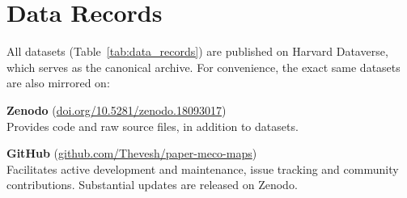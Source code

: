 \documentclass[11pt]{article}
\begin{document}
\section*{Data Records}

All datasets (Table~\ref{tab:data_records}) are published on Harvard Dataverse,\cite{meco2_dataset} which serves as the canonical archive. For convenience, the exact same datasets are also mirrored on:

\begin{enumbul}
	\item \textbf{Zenodo}\cite{meco2_codebase} (\href{https://doi.org/10.5281/zenodo.18093017}{doi.org/10.5281/zenodo.18093017})\\
	Provides code and raw source files, in addition to datasets.

	\item \textbf{GitHub} (\href{https://github.com/Thevesh/paper-meco-maps}{github.com/Thevesh/paper-meco-maps})\\
	Facilitates active development and maintenance, issue tracking and community contributions. Substantial updates are released on Zenodo.
\end{enumbul}
\end{document}
